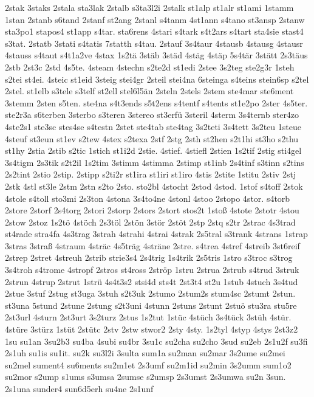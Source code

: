 {2stak
3staks
2stala
sta3lak
2stalb
s3ta3l2i
2stalk
st1alp
st1alr
st1ami
1stamm
1stan
2stanb
s6tand
2stanf
st2ang
2stanl
s4tanm
4st1ann
s4tano
st3ansp
2stanw
sta3po1
stapos4
st1app
s4tar.
sta6rens
4stari
s4tark
s4t2ars
s4tart
sta4sie
stast4
s3tat.
2statb
3stati
s4tatis
7statth
s4tau.
2stauf
3s4taur
4stausb
4stausg
4stausr
4stauss
s4taut
s4t1a2ve
4stax
1s2tä
3stäb
3städ
4stäg
4stäp
5s4tär
3stätt
2s3täus
2stb
2st3c
2std
4s5te.
4steam
4stechn
s2te2d
st1edi
2stee
3s2teg
ste2g3r
1steh
s2tei
st4ei.
4steic
st1eid
3steig
stei4gr
2steil
stei4na
6steinga
s4teins
stein6sp
s2tel
2stel.
st1elb
s3tele
s3telf
st2ell
stel6l5än
2steln
2stels
2stem
ste4mar
ste6ment
3stemm
2sten
s5ten.
ste4na
s4t3ends
s5t2ens
s4tentf
s4tents
st1e2po
2ster
4s5ter.
ste2r3a
s6terben
3sterbo
s3teren
3stereo
st3erfü
3steril
4sterm
3s4ternb
ster4zo
4ste2s1
ste3sc
stes4se
s4testn
2stet
ste4tab
ste4tag
3s2teti
3s4tett
3s2teu
1steue
4steuf
st3eun
st1ev
s2tew
4stex
s2texa
2stf
2stg
2sth
st2hen
s2t1hi
st3ho
s2thu
st1hy
2stia
2stib
s2tic
1stich
st1i2d
2stie.
4stief.
4stiefl
2stien
1s2tif
2stig
sti4gel
3s4tigm
2s3tik
s2t2il
1s2tim
3stimm
4stimma
2stimp
st1inb
2s4tinf
s3tinn
s2tins
2s2tint
2stio
2stip.
2stipp
s2ti2r
st1ira
st1iri
st1iro
4stis
2stite
1stitu
2stiv
2stj
2stk
4stl
st3le
2stm
2stn
s2to
2sto.
sto2bl
4stocht
2stod
4stod.
1stof
s4toff
2stok
4stole
s4toll
sto3mi
2s3ton
4stona
3s4to4ne
4stonl
4stoo
2stopo
4stor.
s4torb
2store
2storf
2s4torg
2stori
2storp
2stors
2stort
stos2t
1stoß
4stote
2stotr
4stou
2stow
2stoz
1s2tö
4stöch
2s3töl
2stön
3stör
2stöt
2stp
2stq
s2tr
2strac
4s3trad
st4rade
stra4fa
4s3trag
3strah
4strahi
4strai
4strak
2s5tral
s3trank
4strans
1strap
3stras
3straß
4straum
4sträc
4s5träg
4sträne
2stre.
s4trea
4stref
4streib
3st6reif
2strep
2stret
4streuh
2strib
strie3s4
2s4trig
1s4trik
2s5tris
1stro
s3troc
s3trog
3s4troh
s4trome
4stropf
2stros
st4ross
2ströp
1stru
2strua
2strub
s4trud
3struk
2strun
4strup
2strut
1strü
4s4t3s2
stsi4d
sts4t
2st3t4
st2u
1stub
4stuch
3s4tud
2stue
3stuf
2stug
st3uga
3stuh
s2t3uk
2stumo
2stum2s
stum4sc
2stumt
2stun.
st3una
5stund
2stune
2stung
s2t3uni
4stunn
2stuns
2stunt
2stuö
stu3ra
stu5re
2st3url
4sturn
2st3urt
3s2turz
2stus
1s2tut
1stüc
4stüch
3s4tück
3stüh
4stür.
4stüre
3stürz
1stüt
2stütc
2stv
2stw
stwor2
2sty
4sty.
1s2tyl
4styp
4stys
2st3z2
1su
su1an
3su2b3
su4ba
4subi
su4br
3su1c
su2cha
su2cho
3sud
su2eb
2s1u2f
su3fi
2s1uh
su1is
su1it.
su2k
su3l2i
3sulta
sum1a
su2man
su2mar
3s2ume
su2mei
su2mel
sument4
su6ments
su2m1et
2s3umf
su2m1id
su2min
3s2umm
sum1o2
su2mor
s2ump
s1ums
s3umsa
2sumse
s2umsp
2s3umst
2s3umwa
su2n
3sun.
2s1una
sunder4
sun6d5erh
su4ne
2s1unf
}
